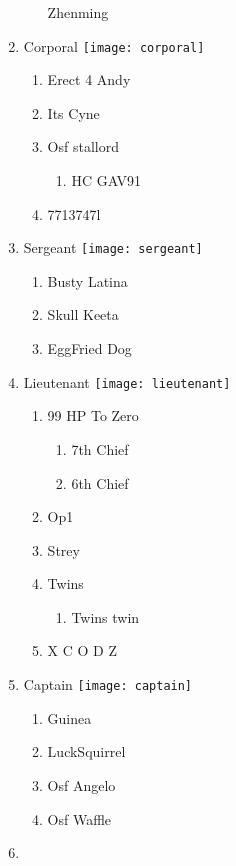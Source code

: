 \documentclass{article}
\begin{document}
\begin{enumerate}[I]
\begin{enumerate}[I]
	Zhenming
    \end{enumerate}
  \item
    Corporal \texttt{[image: corporal]}
    \begin{enumerate}[I]
      \item
	Erect 4 Andy
      \item
	Its Cyne
      \item
	Osf stallord
	\begin{enumerate}[I]
	  \item
	    HC GAV91
	\end{enumerate}
      \item
	7713747l
    \end{enumerate}
  \item
    Sergeant \texttt{[image: sergeant]}
    \begin{enumerate}[I]
      \item
	Busty Latina
      \item
	Skull Keeta
      \item
	EggFried Dog
    \end{enumerate}
  \item
    Lieutenant \texttt{[image: lieutenant]}
    \begin{enumerate}[I]
      \item 
	99 HP To Zero
	\begin{enumerate}[I]
	  \item
	    7th Chief
	  \item
	    6th Chief
	\end{enumerate}
      \item
	Op1
      \item
	Strey
      \item
	Twins
	  \begin{enumerate}[I]
	    \item
	      Twins twin
	  \end{enumerate}
      \item
	X C O D Z
    \end{enumerate}
  \item
    Captain \texttt{[image: captain]}
    \begin{enumerate}[I]
      \item
	Guinea
      \item
	LuckSquirrel
      \item
	Osf Angelo
      \item
	Osf Waffle
    \end{enumerate}
  \item

\end{enumerate}
\end{document}
